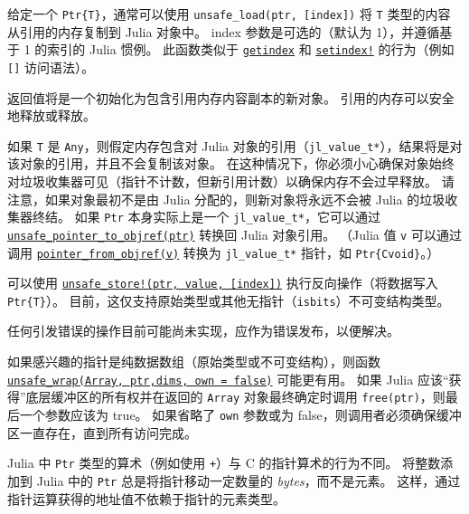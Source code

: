 给定一个 \texttt{Ptr\{T\}}，通常可以使用 \texttt{unsafe\_load(ptr, [index])} 将 \texttt{T} 类型的内容从引用的内存复制到 Julia 对象中。 index 参数是可选的（默认为 1），并遵循基于 1 的索引的 Julia 惯例。 此函数类似于 \hyperlink{13720608614876840481}{\texttt{getindex}} 和 \hyperlink{1309244355901386657}{\texttt{setindex!}} 的行为（例如\texttt{[]} 访问语法）。



返回值将是一个初始化为包含引用内存内容副本的新对象。 引用的内存可以安全地释放或释放。



如果 \texttt{T} 是 \texttt{Any}，则假定内存包含对 Julia 对象的引用（\texttt{jl\_value\_t*}），结果将是对该对象的引用，并且不会复制该对象。 在这种情况下，你必须小心确保对象始终对垃圾收集器可见（指针不计数，但新引用计数）以确保内存不会过早释放。 请注意，如果对象最初不是由 Julia 分配的，则新对象将永远不会被 Julia 的垃圾收集器终结。 如果 \texttt{Ptr} 本身实际上是一个 \texttt{jl\_value\_t*}，它可以通过 \hyperlink{10812596548944930674}{\texttt{unsafe\_pointer\_to\_objref(ptr)}} 转换回 Julia 对象引用。 （Julia 值 \texttt{v} 可以通过调用 \hyperlink{9366554937543398846}{\texttt{pointer\_from\_objref(v)}} 转换为 \texttt{jl\_value\_t*} 指针，如 \texttt{Ptr\{Cvoid\}}。）



可以使用 \hyperlink{4579672834750013041}{\texttt{unsafe\_store!(ptr, value, [index])}} 执行反向操作（将数据写入 \texttt{Ptr\{T\}}）。 目前，这仅支持原始类型或其他无指针（\texttt{isbits}）不可变结构类型。



任何引发错误的操作目前可能尚未实现，应作为错误发布，以便解决。



如果感兴趣的指针是纯数据数组（原始类型或不可变结构），则函数 \hyperlink{2210267857349684744}{\texttt{unsafe\_wrap(Array, ptr,dims, own = false)}} 可能更有用。 如果 Julia 应该“获得”底层缓冲区的所有权并在返回的 \texttt{Array} 对象最终确定时调用 \texttt{free(ptr)}，则最后一个参数应该为 true。 如果省略了 \texttt{own} 参数或为 false，则调用者必须确保缓冲区一直存在，直到所有访问完成。



Julia 中 \texttt{Ptr} 类型的算术（例如使用 \texttt{+}）与 C 的指针算术的行为不同。 将整数添加到 Julia 中的 \texttt{Ptr} 总是将指针移动一定数量的 \emph{bytes}，而不是元素。 这样，通过指针运算获得的地址值不依赖于指针的元素类型。



\hypertarget{11710684987427742051}{}


